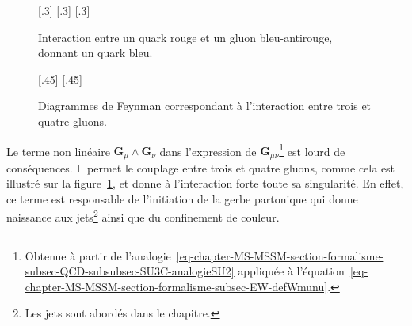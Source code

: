 \begin{figure}[h]
\centering
\vspace{\baselineskip}
[.3\textwidth]
{\vspace{\baselineskip}}
\hfill
{}[.3\textwidth]
{\vspace{\baselineskip}}
\hfill
{}[.3\textwidth]
{\vspace{\baselineskip}}

\caption[Interaction entre un quark et un gluon.]{Interaction entre un quark rouge et un gluon bleu-antirouge, donnant un quark bleu.}
\label{fig-fgraph-QCD_color_flux}

\vspace{\baselineskip}
\centering
\vspace{\baselineskip}
\subcaptionbox{\label{subfig-fgraph-ggg}}[.45\textwidth]
{\vspace{\baselineskip}}
\hfill
\subcaptionbox{\label{subfig-fgraph-gggg}}[.45\textwidth]
{\vspace{\baselineskip}}

\caption{Diagrammes de Feynman correspondant à l'interaction entre trois et quatre gluons.}
\label{fig-fgraph-QCD_3_et_4_gluons}
\end{figure}
\par Le terme non linéaire $\bm{G}_\mu\wedge\bm{G}_\nu$ dans l'expression de $\bm{G}_{\mu\nu}$\footnote{Obtenue à partir de l'analogie~\eqref{eq-chapter-MS-MSSM-section-formalisme-subsec-QCD-subsubsec-SU3C-analogieSU2} appliquée à l'équation~\eqref{eq-chapter-MS-MSSM-section-formalisme-subsec-EW-defWmunu}.} est lourd de conséquences.
Il permet le couplage entre trois et quatre gluons, comme cela est illustré sur la figure~\ref{fig-fgraph-QCD_3_et_4_gluons}, et donne à l'interaction forte toute sa singularité. En effet, ce terme est responsable de l'initiation de la gerbe partonique qui donne naissance aux jets\footnote{Les jets sont abordés dans le chapitre.} ainsi que du confinement de couleur.
